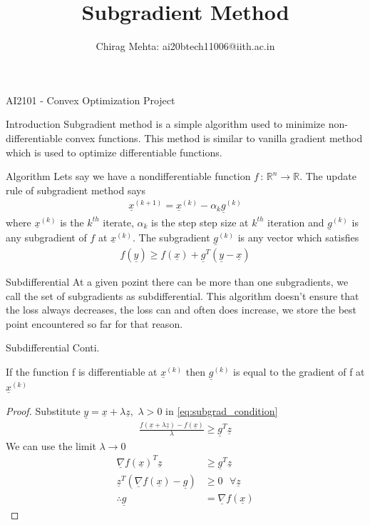 \documentclass{beamer}
\title{Subgradient Method}
\author[]{Chirag Mehta: ai20btech11006@iith.ac.in}
\institute{Indian Institute Of Technology, Hyderabad}
\date{}
\newcommand\twospace{\,\,}
\newcommand\fourspace{\,\,\,\,}
\renewcommand{\vec}[1]{\underline{#1}}
\begin{document}
\begin{frame}{AI2101 - Convex Optimization Project}
\titlepage
\end{frame}

\begin{frame}{Introduction}
    Subgradient method is a simple algorithm used to minimize non-differentiable convex functions. This method is similar to vanilla gradient method which is used to optimize differentiable functions.~\cite{boyd2003subgradient}
\end{frame}

\begin{frame}{Algorithm}
    Lets say we have a nondifferentiable function $f\, : \, \mathbb{R}^n\to \mathbb{R}$. The update rule of subgradient method says
    \begin{align}
        \vec{x}^{(k+1)} = \vec{x}^{(k)} - \alpha_k\vec{g}^{(k)} \label{eq:subgrad_iter}
    \end{align}
    where $\vec{x}^{(k)}$ is the $k^{th}$ iterate, $\alpha_k$ is the step step size at $k^{th}$ iteration and $\vec{g}^{(k)}$ is any subgradient of $f$ at $\vec{x}^{(k)}$. The subgradient $\vec{g}^{(k)}$ is any vector which satisfies
    \begin{align}
        f(\vec{y}) \geq f(\vec{x}) + \vec{g}^T(\vec{y}-\vec{x})\label{eq:subgrad_condition}
    \end{align}
\end{frame}
\begin{frame}{Subdifferential}
    At a given pozint there can be more than one subgradients, we call the set of subgradients as subdifferential. This algorithm doesn't ensure that the loss always decreases, the loss can and often does increase, we store the best point encountered so far for that reason.
\end{frame}
\begin{frame}{Subdifferential Conti.}
        \begin{theorem}
        If the function f is differentiable at $\vec{x}^{(k)}$ then $\vec{g}^{(k)}$ is equal to the gradient of f at $\vec{x}^{(k)}$
    \end{theorem}
    \begin{proof}
        Substitute $\vec{y} = \vec{x}+\lambda\vec{z},\twospace \lambda > 0$ in \eqref{eq:subgrad_condition}
        \begin{align}
            \frac{f(\vec{x}+\lambda\vec{z}) - f(\vec{x})}{\lambda} \geq \vec{g}^T\vec{z}
        \end{align}
        We can use the limit $\lambda \to 0$
        \begin{align}
            \vec{\nabla}f(\vec{x})^T\vec{z} &\geq \vec{g}^T\vec{z}\\
            \vec{z}^T\left(\vec{\nabla}f(\vec{x})-\vec{g}\right) &\geq 0 \fourspace \forall \vec{z}\\
            \therefore \vec{g} & = \vec{\nabla}f(\vec{x})
        \end{align}
    \end{proof}
\end{frame}
\end{document}
